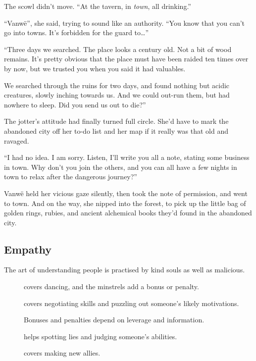 \begin{multicols}{2}
\begin{exampletext}
  The scowl didn't move.
  ``At the tavern, in \emph{town}, all drinking.''

  ``Vanw\"e'', she said, trying to sound like an authority.
  ``You know that you can't go into towns.
  It's forbidden for the \gls{guard} to\ldots''

  ``Three days we searched.
  The place looks a century old.
  Not a bit of wood remains.
  It's pretty obvious that the place must have been raided ten times over by now, but we trusted you when you said it had valuables.

  We searched through the ruins for two days, and found nothing but acidic creatures, slowly inching towards us.
  And we could out-run them, but had nowhere to sleep.
  Did you send us out to die?''

  The \gls{jotter}'s attitude had finally turned full circle.
  She'd have to mark the abandoned city off her to-do list and her map if it really was that old and ravaged.

  ``I had no idea.
  I am sorry.
  Listen, I'll write you all a note, stating some business in town.
  Why don't you join the others, and you can all have a few nights in town to relax after the dangerous journey?''

  Vanw\"e held her vicious gaze silently, then took the note of permission, and went to town.
  And on the way, she nipped into the forest, to pick up the little bag of golden rings, rubies, and ancient alchemical books they'd found in the abandoned city.

\end{exampletext}

\subsection{Empathy}

The art of understanding people is practised by kind souls as well as malicious.

\begin{description}
  \item[]
    covers dancing, and the minstrels add a bonus or penalty.
  \item[]
    covers negotiating skills and puzzling out someone's likely motivations.

    Bonuses and penalties depend on leverage and information.
  \item[]
    helps spotting lies and judging someone's abilities.
  \item[]
    covers making new allies.
\end{description}


\end{multicols}

